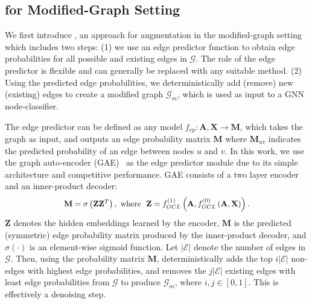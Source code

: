 \documentclass[letterpaper]{article} \usepackage{aaai21}  \usepackage{times}  \usepackage{helvet} \usepackage{courier}  \usepackage[hyphens]{url}  \usepackage{graphicx} \urlstyle{rm} \def\UrlFont{\rm}  \usepackage{natbib}  \usepackage{caption} \frenchspacing  \setlength{\pdfpagewidth}{8.5in}  \setlength{\pdfpageheight}{11in}
\newcommand*{\scale}[2][4]{\scalebox{#1}{$#2$}}
\begin{document}
\subsection{\methodtwo for Modified-Graph Setting}
\label{sec:edgemanip_twostep}







We first introduce \methodtwo, an approach for augmentation in the modified-graph setting which includes two steps: (1) we use an edge predictor function to obtain edge probabilities for all possible and existing edges in $\mathcal{G}$. The role of the edge predictor is flexible and can generally be replaced with any suitable method. (2) Using the predicted edge probabilities, we deterministically add (remove) new (existing) edges to create a modified graph $\mathcal{G}_m$, which is used as input to a GNN node-classifier.

The edge predictor can be defined as any model $f_{ep}: \mathbf{A}, \mathbf{X} \rightarrow \mathbf{M}$, which takes the graph as input, and outputs an edge probability matrix $\mathbf{M}$ where $\mathbf{M}_{uv}$ indicates the predicted probability of an edge between nodes $u$ and $v$.  In this work, we use the graph auto-encoder (GAE)~\cite{kipf2016variational} as the edge predictor module due to its simple architecture and competitive performance. GAE consists of a two layer \gcn encoder and an inner-product decoder:
\begin{equation}
\scale[0.95]{
    \mathbf{M} = \sigma\left(\mathbf{Z}\mathbf{Z}^T\right), \ \mbox{where} \ \ \mathbf{Z} = f_{GCL}^{(1)}\left(\mathbf{A}, f_{GCL}^{(0)}\left(\mathbf{A}, \mathbf{X}\right)\right).
}
\end{equation}
$\mathbf{Z}$ denotes the hidden embeddings learned by the encoder, $\mathbf{M}$ is the predicted (symmetric) edge probability matrix produced by the inner-product decoder, and $\sigma(\cdot)$ is an element-wise sigmoid function.  Let $|\mathcal{E}|$ denote the number of edges in $\mathcal{G}$. Then, using the probability matrix $\mathbf{M}$, 
\methodtwo deterministically adds the top $i|\mathcal{E}|$ non-edges with highest edge probabilities, and removes the $j|\mathcal{E}|$ existing edges with least edge probabilities from $\mathcal{G}$ to produce $\mathcal{G}_m$, where $i, j \in [0, 1]$. This is effectively a denoising step.
\end{document}
